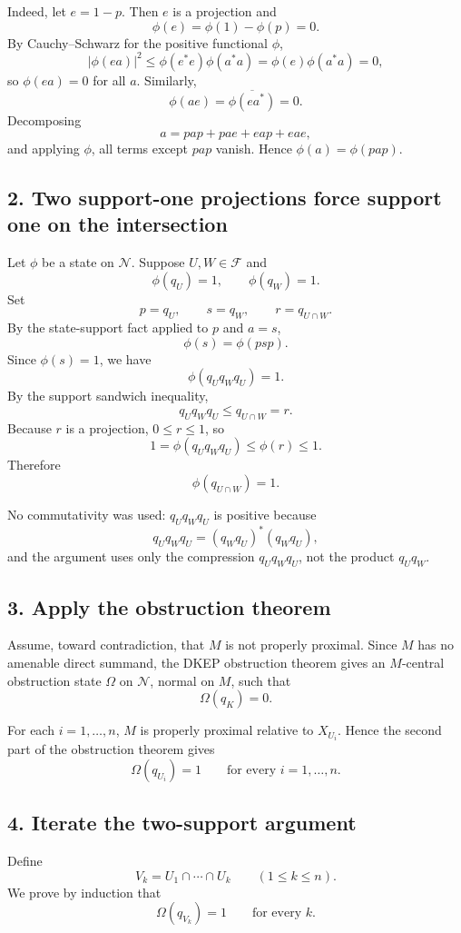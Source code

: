 Indeed, let \(e=1-p\). Then \(e\) is a projection and
\[
\phi(e)=\phi(1)-\phi(p)=0.
\]
By Cauchy–Schwarz for the positive functional \(\phi\),
\[
|\phi(ea)|^2\le \phi(e^*e)\phi(a^*a)=\phi(e)\phi(a^*a)=0,
\]
so \(\phi(ea)=0\) for all \(a\). Similarly,
\[
\phi(ae)=\overline{\phi(ea^*)}=0.
\]
Decomposing
\[
a=pap+pae+eap+eae,
\]
and applying \(\phi\), all terms except \(pap\) vanish. Hence \(\phi(a)=\phi(pap)\).

\subsection*{2. Two support-one projections force support one on the intersection}

Let \(\phi\) be a state on \(\mathcal N\). Suppose \(U,W\in\mathcal F\) and
\[
\phi(q_U)=1,\qquad \phi(q_W)=1.
\]
Set
\[
p=q_U,\qquad s=q_W,\qquad r=q_{U\cap W}.
\]
By the state-support fact applied to \(p\) and \(a=s\),
\[
\phi(s)=\phi(psp).
\]
Since \(\phi(s)=1\), we have
\[
\phi(q_Uq_Wq_U)=1.
\]
By the support sandwich inequality,
\[
q_Uq_Wq_U\le q_{U\cap W}=r.
\]
Because \(r\) is a projection, \(0\le r\le 1\), so
\[
1=\phi(q_Uq_Wq_U)\le \phi(r)\le 1.
\]
Therefore
\[
\phi(q_{U\cap W})=1.
\]

No commutativity was used: \(q_Uq_Wq_U\) is positive because
\[
q_Uq_Wq_U=(q_Wq_U)^*(q_Wq_U),
\]
and the argument uses only the compression \(q_Uq_Wq_U\), not the product \(q_Uq_W\).

\subsection*{3. Apply the obstruction theorem}

Assume, toward contradiction, that \(M\) is not properly proximal. Since \(M\) has no amenable direct summand, the DKEP obstruction theorem gives an \(M\)-central obstruction state \(\Omega\) on \(\mathcal N\), normal on \(M\), such that
\[
\Omega(q_K)=0.
\]

For each \(i=1,\dots,n\), \(M\) is properly proximal relative to \(X_{U_i}\). Hence the second part of the obstruction theorem gives
\[
\Omega(q_{U_i})=1
\qquad\text{for every }i=1,\dots,n.
\]

\subsection*{4. Iterate the two-support argument}

Define
\[
V_k=U_1\cap\cdots\cap U_k
\qquad (1\le k\le n).
\]
We prove by induction that
\[
\Omega(q_{V_k})=1
\qquad\text{for every }k.
\]

